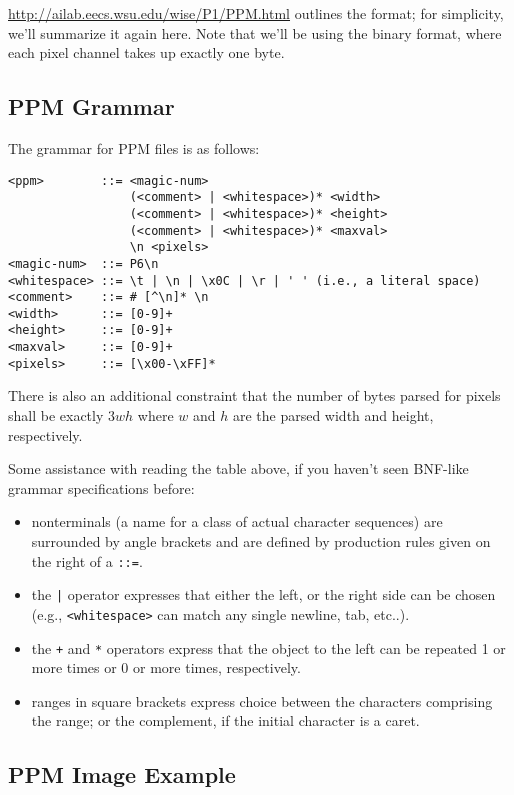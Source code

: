 \documentclass{article}
\begin{document}
\url{http://ailab.eecs.wsu.edu/wise/P1/PPM.html} outlines the format; for simplicity, we'll summarize it again here. Note that we'll be using the binary format, where each pixel channel takes up exactly one byte.

\subsection*{PPM Grammar}

The grammar for PPM files is as follows:

\begin{verbatim}
<ppm>        ::= <magic-num>
                 (<comment> | <whitespace>)* <width>
                 (<comment> | <whitespace>)* <height>
                 (<comment> | <whitespace>)* <maxval>
                 \n <pixels>
<magic-num>  ::= P6\n
<whitespace> ::= \t | \n | \x0C | \r | ' ' (i.e., a literal space)
<comment>    ::= # [^\n]* \n
<width>      ::= [0-9]+
<height>     ::= [0-9]+
<maxval>     ::= [0-9]+
<pixels>     ::= [\x00-\xFF]*
\end{verbatim}

There is also an additional constraint that the number of bytes parsed for pixels shall be exactly \(3wh\) where \(w\) and \(h\) are the parsed width and height, respectively.

Some assistance with reading the table above, if you haven't seen BNF-like grammar specifications before:
\begin{itemize}
    \item nonterminals (a name for a class of actual character sequences) are surrounded by angle brackets and are defined by production rules given on the right of a \texttt{::=}.
    \item the \texttt{|} operator expresses that either the left, or the right side can be chosen (e.g., \texttt{<whitespace>} can match any single newline, tab, etc..).
    \item the \texttt{+} and \texttt{*} operators express that the object to the left can be repeated 1 or more times or 0 or more times, respectively.
    \item ranges in square brackets express choice between the characters comprising the range; or the complement, if the initial character is a caret.
\end{itemize}

\subsection*{PPM Image Example}
\end{document}
